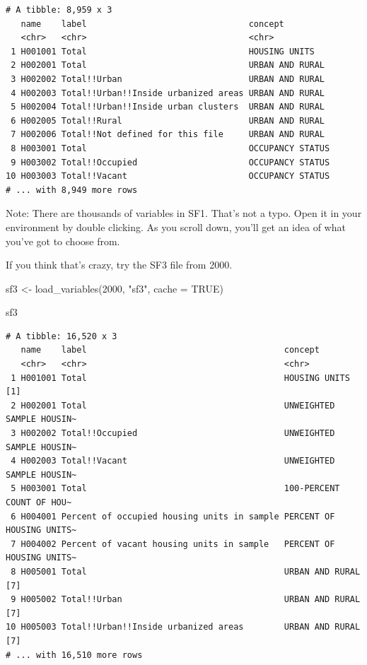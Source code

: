 \documentclass[
  letterpaper,
  DIV=11,
  numbers=noendperiod]{scrreprt}
\newenvironment{Shaded}{\begin{snugshade}}{\end{snugshade}}
\newcommand{\AttributeTok}[1]{\textcolor[rgb]{0.40,0.45,0.13}{#1}}
\newcommand{\ConstantTok}[1]{\textcolor[rgb]{0.56,0.35,0.01}{#1}}
\newcommand{\DecValTok}[1]{\textcolor[rgb]{0.68,0.00,0.00}{#1}}
\newcommand{\FunctionTok}[1]{\textcolor[rgb]{0.28,0.35,0.67}{#1}}
\newcommand{\NormalTok}[1]{\textcolor[rgb]{0.00,0.23,0.31}{#1}}
\newcommand{\OtherTok}[1]{\textcolor[rgb]{0.00,0.23,0.31}{#1}}
\newcommand{\StringTok}[1]{\textcolor[rgb]{0.13,0.47,0.30}{#1}}
\begin{document}
\begin{verbatim}
# A tibble: 8,959 x 3
   name    label                                concept         
   <chr>   <chr>                                <chr>           
 1 H001001 Total                                HOUSING UNITS   
 2 H002001 Total                                URBAN AND RURAL 
 3 H002002 Total!!Urban                         URBAN AND RURAL 
 4 H002003 Total!!Urban!!Inside urbanized areas URBAN AND RURAL 
 5 H002004 Total!!Urban!!Inside urban clusters  URBAN AND RURAL 
 6 H002005 Total!!Rural                         URBAN AND RURAL 
 7 H002006 Total!!Not defined for this file     URBAN AND RURAL 
 8 H003001 Total                                OCCUPANCY STATUS
 9 H003002 Total!!Occupied                      OCCUPANCY STATUS
10 H003003 Total!!Vacant                        OCCUPANCY STATUS
# ... with 8,949 more rows
\end{verbatim}

Note: There are thousands of variables in SF1. That's not a typo. Open
it in your environment by double clicking. As you scroll down, you'll
get an idea of what you've got to choose from.

If you think that's crazy, try the SF3 file from 2000.

\begin{Shaded}
\begin{Highlighting}[]
\NormalTok{sf3 }\OtherTok{\textless{}{-}} \FunctionTok{load\_variables}\NormalTok{(}\DecValTok{2000}\NormalTok{, }\StringTok{"sf3"}\NormalTok{, }\AttributeTok{cache =} \ConstantTok{TRUE}\NormalTok{)}

\NormalTok{sf3}
\end{Highlighting}
\end{Shaded}

\begin{verbatim}
# A tibble: 16,520 x 3
   name    label                                       concept                  
   <chr>   <chr>                                       <chr>                    
 1 H001001 Total                                       HOUSING UNITS [1]        
 2 H002001 Total                                       UNWEIGHTED SAMPLE HOUSIN~
 3 H002002 Total!!Occupied                             UNWEIGHTED SAMPLE HOUSIN~
 4 H002003 Total!!Vacant                               UNWEIGHTED SAMPLE HOUSIN~
 5 H003001 Total                                       100-PERCENT COUNT OF HOU~
 6 H004001 Percent of occupied housing units in sample PERCENT OF HOUSING UNITS~
 7 H004002 Percent of vacant housing units in sample   PERCENT OF HOUSING UNITS~
 8 H005001 Total                                       URBAN AND RURAL [7]      
 9 H005002 Total!!Urban                                URBAN AND RURAL [7]      
10 H005003 Total!!Urban!!Inside urbanized areas        URBAN AND RURAL [7]      
# ... with 16,510 more rows
\end{verbatim}
\end{document}
